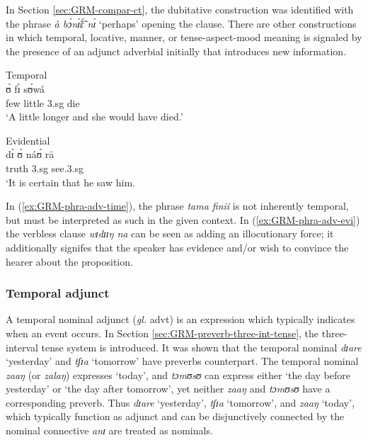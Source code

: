 \begin{exe}
\begin{exe}
\begin{exe}
 In Section \ref{sec:GRM-compar-ct}, the dubitative construction was 
identified with the phrase  {\it à bɔ́nɪ̃́ɛ̃́ nɪ́}  `perhaps'  opening the 
clause. There are other constructions in which temporal, locative, manner, or 
tense-aspect-mood meaning is signaled by the presence of an adjunct adverbial  
initially that introduces new information.  

\ea\label{ex:GRM-phra-adv}

\ea\label{ex:GRM-phra-adv-time}{\rm Temporal}\\
\gll [tàmá fìníì] ʊ̀ fɪ̀ sʊ́wá\\
few little {\sc 3.sg} {\mod} die\\
\glt `A little longer and she would  have died.'


\ex\label{ex:GRM-phra-adv-evi}{\rm Evidential}\\
\gll [wɪ́dɪ́ɪ́ŋ ná] dɪ́ ʊ̀ náʊ́ rā\\
truth {\foc} {\comp} {\sc 3.sg} see.{\sc 3.sg} {\foc} \\
\glt  `It is certain that he saw him.

\z 
 \z



In (\ref{ex:GRM-phra-adv-time}), the phrase {\it tama finii} is not inherently 
temporal, but must be interpreted as such in the given context. In 
(\ref{ex:GRM-phra-adv-evi}) the verbless clause {\it wɪdɪɪŋ na}  can be seen as 
adding an illocutionary force; it additionally signifes that the speaker has 
evidence and/or wish to convince the hearer about the proposition. 

% 

\subsubsection{Temporal  adjunct}
\label{sec:GRM-manner-adv}

A temporal nominal adjunct  ({\it gl.} {\sc advt}) is an expression which 
typically indicates when  an event occurs. In Section 
\ref{sec:GRM-preverb-three-int-tense}, the three-interval tense system is 
introduced.  It was shown that the temporal nominal {\it  dɪare} `yesterday' and 
{\it tʃɪa} `tomorrow'  have preverbs counterpart.  The  temporal nominal  {\it 
zaaŋ} (or {\it zalaŋ}) expresses `today',  and   {\it tɔmʊsʊ} can express either 
 `the day before yesterday' or  `the day after tomorrow',   yet neither {\it 
zaaŋ} and {\it tɔmʊsʊ}   have a corresponding preverb. Thus {\it  dɪare} 
`yesterday',  {\it tʃɪa} `tomorrow',   and  {\it zaaŋ} `today', which  typically 
function as adjunct  and can be disjunctively connected by the nominal 
connective {\it anɪ}  are  treated as nominals.


\end{exe}
\end{exe}
\end{exe}
